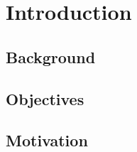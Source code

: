 \chapter{Introduction}\label{chap:intro}

\section{Background}

\section{Objectives}

\section{Motivation}


